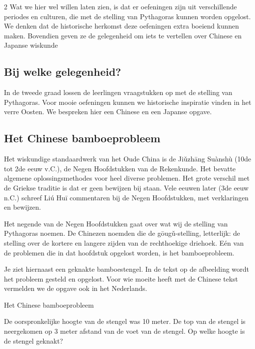 \begin{multicols}{2}
    Wat we hier wel willen laten zien, is dat er oefeningen zijn uit verschillende periodes en culturen, die met de stelling van Pythagoras kunnen worden opgelost. We denken dat de historische herkomst deze oefeningen extra boeiend kunnen maken. Bovendien geven ze de gelegenheid om iets te vertellen over Chinese en Japanse wiskunde 

    \subsection*{Bij welke gelegenheid?}
  
    In de tweede graad lossen de leerlingen vraagstukken op met de stelling van Pythagoras. Voor mooie oefeningen kunnen we historische inspiratie vinden in het verre Oosten. We bespreken hier een Chinese en een Japanse opgave.

    \subsection*{Het Chinese bamboeprobleem}

    Het wiskundige standaardwerk van het Oude China is de Jiǔzhāng Suànshù (10de tot 2de eeuw v.C.), de Negen Hoofdstukken van de Rekenkunde. Het bevatte algemene oplossingsmethodes voor heel diverse problemen. Het grote verschil met de Griekse traditie is dat er geen bewijzen bij staan. Vele eeuwen later (3de eeuw n.C.) schreef Liú Huī commentaren bij de Negen Hoofdstukken, met verklaringen en bewijzen.

    Het negende van de Negen Hoofdstukken gaat over wat wij de stelling van Pythagoras noemen. De Chinezen noemden die de gōugǔ-stelling, letterlijk: de stelling over de kortere en langere zijden van de rechthoekige driehoek. Eén van de problemen die in dat hoofdstuk opgelost worden, is het bamboeprobleem.

    Je ziet hiernaast een geknakte bamboestengel. In de tekst op de afbeelding wordt het probleem gesteld en opgelost. Voor wie moeite heeft met de Chinese tekst vermelden we de opgave ook in het Nederlands.

    \vfill\null
    \columnbreak

\begin{kader}{Het Chinese bamboeprobleem}{}

De oorspronkelijke hoogte van de stengel was 10 meter. De top van de stengel is neergekomen op 3 meter afstand van de voet van de stengel. Op welke hoogte is de stengel geknakt? 


\end{kader}
\end{multicols}
